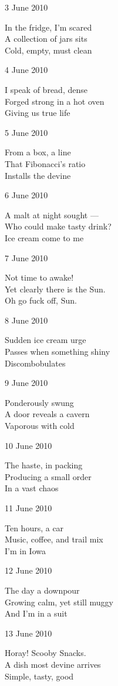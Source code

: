 \documentclass[12pt]{article}
\begin{document}
3 June 2010

In the fridge, I'm scared \\
A collection of jars sits \\
Cold, empty, must clean

4 June 2010

I speak of bread, dense \\
Forged strong in a hot oven \\
Giving us true life

5 June 2010

From a box, a line \\
That Fibonacci's ratio \\
Installs the devine

6 June 2010

A malt at night sought --- \\
Who could make tasty drink? \\
Ice cream come to me

7 June 2010

Not time to awake! \\
Yet clearly there is the Sun. \\
Oh go fuck off, Sun.

8 June 2010

Sudden ice cream urge \\
Passes when something shiny \\
Discombobulates

9 June 2010

Ponderously swung \\
A door reveals a cavern \\
Vaporous with cold

\newpage

10 June 2010

The haste, in packing \\
Producing a small order \\
In a vast chaos

11 June 2010

Ten hours, a car \\
Music, coffee, and trail mix \\
I'm in Iowa

12 June 2010

The day a downpour \\
Growing calm, yet still muggy \\
And I'm in a suit

13 June 2010

Horay! Scooby Snacks. \\
A dish most devine arrives \\
Simple, tasty, good
\end{document}
